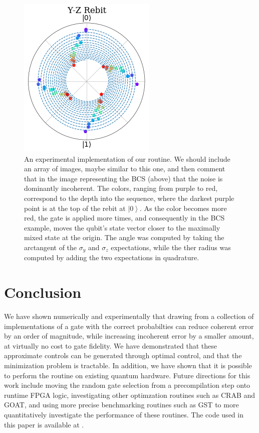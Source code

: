 \documentclass[aps,nofootinbib,pra,notitlepage,twocolumn]{revtex4-1}
\newcommand{\ket}[1]{\ensuremath{\left\vert{#1}\right\rangle}}
\begin{document}
\begin{figure}[H]
  \centering
  \includegraphics[width=.75\columnwidth]{example.png}
  \caption{An experimental implementation of our routine. We should include an array of images, maybe similar to this one, and then comment that in the image representing the BCS (above) that the noise is dominantly incoherent. The colors, ranging from purple to red, correspond to the depth into the sequence, where the darkest purple point is at the top of the rebit at $\ket{0}$. As the color becomes more red, the gate is applied more times, and consequently in the BCS example, moves the qubit's state vector closer to the maximally mixed state at the origin. The angle was computed by taking the arctangent of the $\sigma_y$ and $\sigma_z$ expectations, while the ther radius was computed by adding the two expectations in quadrature.}
  \label{fig:rebit}
\end{figure}

\section{Conclusion}
We have shown numerically and experimentally that drawing from a collection of implementations of a gate with the correct probabilties can reduce coherent error by an order of magnitude, while increasing incoherent error by a smaller amount, at virtually no cost to gate fidelity. We have demonstrated that these approximate controls can be generated through optimal control, and that the minimization problem is tractable. In addition, we have shown that it is possible to perform the routine on existing quantum hardware. Future directions for this work include moving the random gate selection from a precompilation step onto runtime FPGA logic, investigating other optimzation routines such as CRAB \cite{Caneva2011} and GOAT\cite{Machnes2018}, and using more precise benchmarking routines such as GST\cite{BlumeKohout2017} to more quantitatively investigate the performance of these routines. The code used in this paper is available at \cite{decorrelating_errors}.
\end{document}
